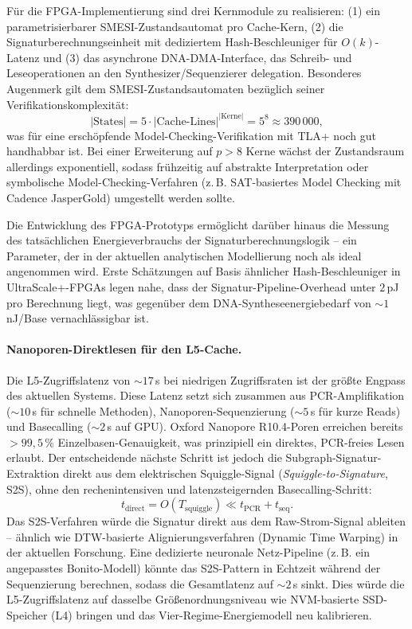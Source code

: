 ﻿\documentclass[a4paper,12pt]{article}
\theoremstyle{definition}
\begin{document}
Für die FPGA-Implementierung sind drei Kernmodule zu realisieren: (1) ein parametrisierbarer SMESI-Zustandsautomat pro Cache-Kern, (2) die Signaturberechnungseinheit mit dediziertem Hash-Beschleuniger für $O(k)$-Latenz und (3) das asynchrone DNA-DMA-Interface, das Schreib- und Leseoperationen an den Synthesizer/Sequenzierer delegation. Besonderes Augenmerk gilt dem SMESI-Zustands\-automaten bezüglich seiner Verifikationskomplexität:
\[
  |\mathrm{States}| = 5 \cdot |\text{Cache-Lines}|^{|\text{Kerne}|}
  = 5^8 \approx 390\,000,
\]
was für eine erschöpfende Model-Checking-Verifikation mit TLA+ noch gut handhabbar ist. Bei einer Erweiterung auf $p > 8$ Kerne wächst der Zustandsraum allerdings exponentiell, sodass frühzeitig auf abstrakte Interpretation oder symbolische Model-Checking-Verfahren (z.\,B. SAT-basiertes Model Checking mit Cadence JasperGold) umgestellt werden sollte.

Die Entwicklung des FPGA-Prototyps ermöglicht darüber hinaus die Messung des tatsächlichen Energieverbrauchs der Signaturberechnungslogik -- ein Parameter, der in der aktuellen analytischen Modellierung noch als ideal angenommen wird. Erste Schätzungen auf Basis ähnlicher Hash-Beschleuniger in UltraScale+-FPGAs legen nahe, dass der Signatur-Pipeline-Overhead unter $2$\,pJ pro Berechnung liegt, was gegenüber dem DNA-Syntheseenergiebedarf von $\sim 1$\,nJ/Base vernachlässigbar ist.

\paragraph{Nanoporen-Direktlesen für den L5-Cache.}
Die L5-Zugriffslatenz von $\sim 17$\,s bei niedrigen Zugriffsraten ist der größte Engpass des aktuellen Systems. Diese Latenz setzt sich zusammen aus PCR-Amplifikation ($\sim 10$\,s für schnelle Methoden), Nanoporen-Sequenzierung ($\sim 5$\,s für kurze Reads) und Basecalling ($\sim 2$\,s auf GPU). Oxford Nanopore R10.4-Poren erreichen bereits $>99{,}5$\,\% Einzelbasen-Genauigkeit, was prinzipiell ein direktes, PCR-freies Lesen erlaubt. Der entscheidende nächste Schritt ist jedoch die Subgraph-Signatur-Extraktion direkt aus dem elektrischen Squiggle-Signal (\emph{Squiggle-to-Signature}, S2S), ohne den rechenintensiven und latenzsteigernden Basecalling-Schritt:
\begin{equation}
  t_{\mathrm{direct}} = O(T_{\mathrm{squiggle}}) \ll t_{\mathrm{PCR}} + t_{\mathrm{seq}}.
\end{equation}
Das S2S-Verfahren würde die Signatur direkt aus dem Raw-Strom-Signal ableiten -- ähnlich wie DTW-basierte Alignierungsverfahren (Dynamic Time Warping) in der aktuellen Forschung. Eine dedizierte neuronale Netz-Pipeline (z.\,B. ein angepasstes Bonito-Modell) könnte das S2S-Pattern in Echtzeit während der Sequenzierung berechnen, sodass die Gesamtlatenz auf $\sim 2$\,s sinkt. Dies würde die L5-Zugriffslatenz auf dasselbe Größenordnungsniveau wie NVM-basierte SSD-Speicher (L4) bringen und das Vier-Regime-Energiemodell neu kalibrieren.
\end{document}
